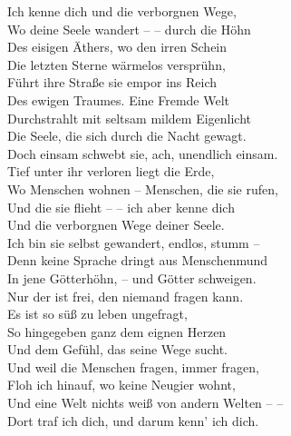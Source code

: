 \begin{liebesgedicht}
Ich kenne dich und die verborgnen Wege,\\ 
Wo deine Seele wandert – – \rejoined durch die Höhn\\
Des eisigen Äthers, wo den irren Schein\\ Die letzten Sterne
wärmelos versprühn,\\ Führt ihre Straße sie empor ins Reich\\ Des
ewigen Traumes. Eine Fremde Welt\\ Durchstrahlt mit seltsam mildem
Eigenlicht\\ Die Seele, die sich durch die Nacht gewagt.\\ Doch
einsam schwebt sie, ach, unendlich einsam.\\ Tief unter ihr
verloren liegt die Erde,\\ Wo Menschen wohnen – Menschen, die sie
rufen,\\
Und die sie flieht – – \rejoined ich aber kenne dich\\
Und die verborgnen Wege deiner Seele.\\ Ich
bin sie selbst gewandert, endlos, stumm –\\ Denn keine Sprache
dringt aus Menschenmund\\ In jene Götterhöhn, – und Götter
schweigen.\\ Nur der ist frei, den niemand fragen kann.\\ Es ist so
süß zu leben ungefragt,\\ So hingegeben ganz dem eignen Herzen\\
Und dem Gefühl, das seine Wege sucht.\\ Und weil die Menschen
fragen, immer fragen,\\ Floh ich hinauf, wo keine Neugier wohnt,\\
Und eine Welt nichts weiß von andern Welten – –\\ Dort traf ich
dich, und darum kenn' ich dich.
\end{liebesgedicht}

